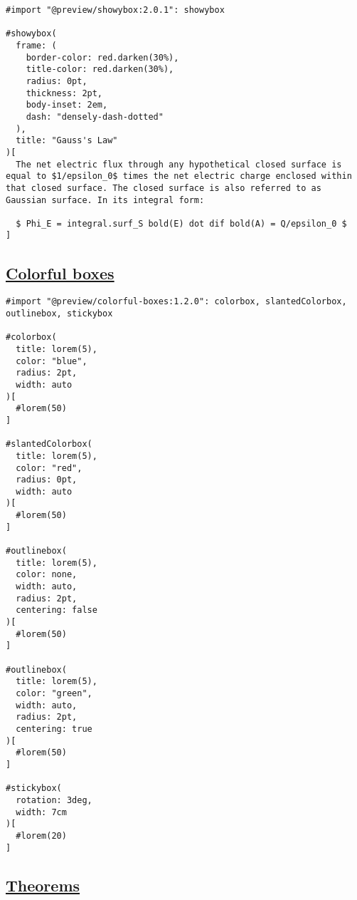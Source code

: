 \pandocbounded{}

\begin{verbatim}
#import "@preview/showybox:2.0.1": showybox

#showybox(
  frame: (
    border-color: red.darken(30%),
    title-color: red.darken(30%),
    radius: 0pt,
    thickness: 2pt,
    body-inset: 2em,
    dash: "densely-dash-dotted"
  ),
  title: "Gauss's Law"
)[
  The net electric flux through any hypothetical closed surface is equal to $1/epsilon_0$ times the net electric charge enclosed within that closed surface. The closed surface is also referred to as Gaussian surface. In its integral form:

  $ Phi_E = integral.surf_S bold(E) dot dif bold(A) = Q/epsilon_0 $
]
\end{verbatim}

\pandocbounded{}

\subsection{\texorpdfstring{\hyperref[colorful-boxes]{Colorful
boxes}}{Colorful boxes}}\label{colorful-boxes}

\begin{verbatim}
#import "@preview/colorful-boxes:1.2.0": colorbox, slantedColorbox, outlinebox, stickybox

#colorbox(
  title: lorem(5),
  color: "blue",
  radius: 2pt,
  width: auto
)[
  #lorem(50)
]

#slantedColorbox(
  title: lorem(5),
  color: "red",
  radius: 0pt,
  width: auto
)[
  #lorem(50)
]

#outlinebox(
  title: lorem(5),
  color: none,
  width: auto,
  radius: 2pt,
  centering: false
)[
  #lorem(50)
]

#outlinebox(
  title: lorem(5),
  color: "green",
  width: auto,
  radius: 2pt,
  centering: true
)[
  #lorem(50)
]

#stickybox(
  rotation: 3deg,
  width: 7cm
)[
  #lorem(20)
]
\end{verbatim}

\pandocbounded{}

\subsection{\texorpdfstring{\hyperref[theorems]{Theorems}}{Theorems}}\label{theorems}

